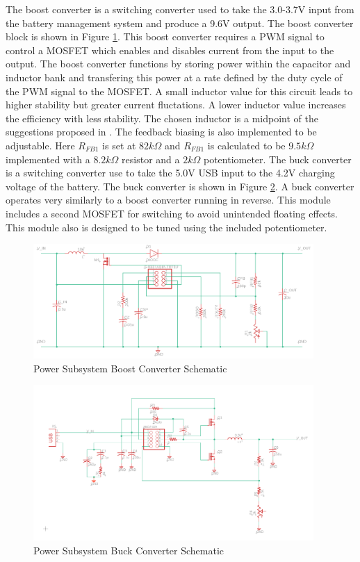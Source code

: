 \documentclass[12pt]{article}
\begin{document}
The boost converter is a switching converter used to take the 3.0-3.7V input from the battery management system and produce a 9.6V output. The boost converter block is shown in Figure \ref{fig:boost_schem}. This boost converter requires a PWM signal to control a MOSFET which enables and disables current from the input to the output. The boost converter functions by storing power within the capacitor and inductor bank and transfering this power at a rate defined by the duty cycle of the PWM signal to the MOSFET. A small inductor value for this circuit leads to higher stability but greater current fluctations. A lower inductor value increases the efficiency with less stability. The chosen inductor is a midpoint of the suggestions proposed in \cite{boost}. The feedback biasing is also implemented to be adjustable. Here $R_{FB1}$ is set at $82k\Omega$ and $R_{FB1}$ is calculated to be $9.5k\Omega$ implemented with a $8.2k\Omega$ resistor and a $2k\Omega$ potentiometer. The buck converter is a switching converter use to take the 5.0V USB input to the 4.2V charging voltage of the battery. The buck converter is shown in Figure \ref{fig:buck_schem}. A buck converter operates very similarly to a boost converter running in reverse. This module includes a second MOSFET for switching to avoid unintended floating effects. This module also is designed to be tuned using the included potentiometer.

\begin{figure}[!h]
	\centering
	\includegraphics[width=0.95\textwidth]{Power_Boost_Schem.png}
	\caption{Power Subsystem Boost Converter Schematic}
	\label{fig:boost_schem}
\end{figure}

\begin{figure}[!h]
	\centering
	\includegraphics[width=0.95\textwidth]{Power_Buck_Schem.png}
	\caption{Power Subsystem Buck Converter Schematic}
	\label{fig:buck_schem}
\end{figure}
\end{document}
